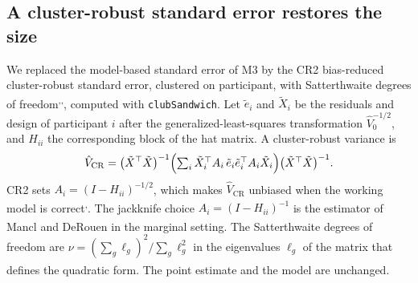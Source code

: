 \documentclass[
  11pt,
]{article}
\begin{document}
\subsection{A cluster-robust standard error restores the size}\label{a-cluster-robust-standard-error-restores-the-size}

We replaced the model-based standard error of M3 by the CR2
bias-reduced cluster-robust standard error, clustered on participant,
with Satterthwaite degrees of freedom\textsuperscript{,,}, computed with
\texttt{clubSandwich}\textsuperscript{}. Let \(\tilde e_i\) and \(\tilde X_i\)
be the residuals and design of participant \(i\) after the
generalized-least-squares transformation \(\hat V_0^{-1/2}\), and
\(H_{ii}\) the corresponding block of the hat matrix. A cluster-robust
variance is
\begin{equation}
\hat V_{\mathrm{CR}} = \bigl(\tilde X^\top \tilde X\bigr)^{-1}
  \Bigl(\textstyle\sum_i \tilde X_i^\top A_i\,\tilde e_i \tilde e_i^\top
  A_i \tilde X_i\Bigr)
  \bigl(\tilde X^\top \tilde X\bigr)^{-1}.
\label{eq:vcr}
\end{equation}
CR2 sets \(A_i = (I - H_{ii})^{-1/2}\), which makes
\(\hat V_{\mathrm{CR}}\) unbiased when the working model is correct\textsuperscript{,}. The jackknife choice
\(A_i = (I - H_{ii})^{-1}\) is the estimator of Mancl and DeRouen\textsuperscript{} in the marginal setting. The Satterthwaite
degrees of freedom are \(\nu = (\sum_g \ell_g)^2 / \sum_g \ell_g^2\) in
the eigenvalues \(\ell_g\) of the matrix that defines the quadratic form\textsuperscript{}. The point estimate and the model are unchanged.

\begin{table}
\centering
\caption{\label{tab:tab-cr2}CR2 remedy at the primary null cell, M3 with the fitted mean. Extended DGP ($c_\times = 0.2$, carryover decaying from the last on-drug mean). Failed counts replicates in which the fit or the CR2 computation failed. They are excluded.}
\centering
{}
\end{table}
\end{document}
